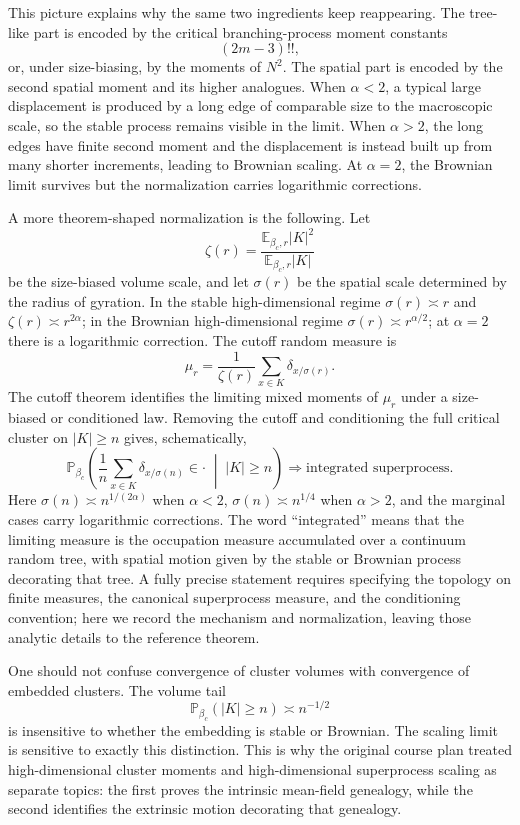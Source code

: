 \documentclass[11pt,reqno]{book}
\numberwithin{equation}{chapter}
\theoremstyle{plain}
\theoremstyle{definition}
\theoremstyle{remark}
\renewcommand{\P}{\mathbb P}
\newcommand{\E}{\mathbb E}
\newcommand{\1}{\mathbf 1}
\begin{document}
This picture explains why the same two ingredients keep reappearing. The tree-like part is encoded by the critical branching-process moment constants
\[
  (2m-3)!!,
\]
or, under size-biasing, by the moments of $N^2$. The spatial part is encoded by the second spatial moment and its higher analogues. When $\alpha<2$, a typical large displacement is produced by a long edge of comparable size to the macroscopic scale, so the stable process remains visible in the limit. When $\alpha>2$, the long edges have finite second moment and the displacement is instead built up from many shorter increments, leading to Brownian scaling. At $\alpha=2$, the Brownian limit survives but the normalization carries logarithmic corrections.

A more theorem-shaped normalization is the following. Let
\[
  \zeta(r)=\frac{\E_{\beta_c,r}|K|^2}{\E_{\beta_c,r}|K|}
\]
be the size-biased volume scale, and let \(\sigma(r)\) be the spatial scale determined by the radius of gyration. In the stable high-dimensional regime \(\sigma(r)\asymp r\) and \(\zeta(r)\asymp r^{2\alpha}\); in the Brownian high-dimensional regime \(\sigma(r)\asymp r^{\alpha/2}\); at \(\alpha=2\) there is a logarithmic correction. The cutoff random measure is
\[
  \mu_r=
  \frac1{\zeta(r)}
  \sum_{x\in K}\delta_{x/\sigma(r)}.
\]
The cutoff theorem identifies the limiting mixed moments of \(\mu_r\) under a size-biased or conditioned law. Removing the cutoff and conditioning the full critical cluster on \(|K|\geq n\) gives, schematically,
\[
  \mathbb P_{\beta_c}\left(
  \frac1n\sum_{x\in K}\delta_{x/\sigma(n)}
  \in\cdot\;\middle|\; |K|\geq n
  \right)
  \Longrightarrow
  \text{integrated superprocess}.
\]
Here \(\sigma(n)\asymp n^{1/(2\alpha)}\) when \(\alpha<2\), \(\sigma(n)\asymp n^{1/4}\) when \(\alpha>2\), and the marginal cases carry logarithmic corrections. The word ``integrated'' means that the limiting measure is the occupation measure accumulated over a continuum random tree, with spatial motion given by the stable or Brownian process decorating that tree. A fully precise statement requires specifying the topology on finite measures, the canonical superprocess measure, and the conditioning convention; here we record the mechanism and normalization, leaving those analytic details to the reference theorem.

One should not confuse convergence of cluster volumes with convergence of embedded clusters. The volume tail
\[
  \P_{\beta_c}(|K|\geq n)\asymp n^{-1/2}
\]
is insensitive to whether the embedding is stable or Brownian. The scaling limit is sensitive to exactly this distinction. This is why the original course plan treated high-dimensional cluster moments and high-dimensional superprocess scaling as separate topics: the first proves the intrinsic mean-field genealogy, while the second identifies the extrinsic motion decorating that genealogy.
\end{document}
